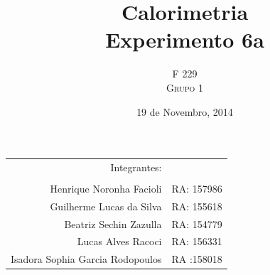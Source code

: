 \documentclass[a4paper]{article}
\title{Calorimetria \\ Experimento 6a} %
\author{F 229 \\ \textsc{Grupo 1}}
\date{19 de Novembro, 2014}
\providecommand{\tabularnewline}{\\}
\providecommand{\tabularnewline}{\\} %
\begin{document}
\maketitle

\begin{center}
	\begin{tabular}{rr}
		                     Integrantes: & \tabularnewline
		                                  & \tabularnewline
		Henrique Noronha Facioli          & RA: 157986 \tabularnewline
		Guilherme Lucas da Silva          & RA: 155618 \tabularnewline
		Beatriz Sechin Zazulla            & RA: 154779 \tabularnewline
		Lucas Alves Racoci                & RA: 156331 \tabularnewline
		Isadora Sophia Garcia Rodopoulos  & RA :158018 \tabularnewline
	\end{tabular}
\par\end{center}

\end{document}
